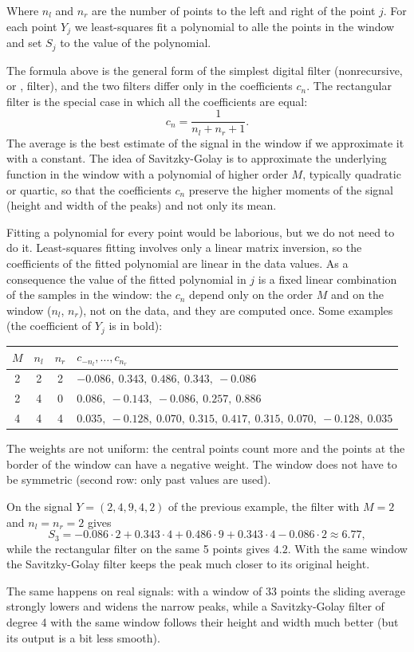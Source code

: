 Where $n_l$ and $n_r$ are the number of points to the left and right of the point $j$. For each point $Y_j$ we least-squares fit a polynomial to alle the points in the window and set $S_j$ to the value of the polynomial.

The formula above is the general form of the simplest digital filter (nonrecursive, or , filter), and the two filters differ only in the coefficients $c_n$. The rectangular filter is the special case in which all the coefficients are equal:
\[
    c_n=\frac{1}{n_l+n_r+1}.
\]
The average is the best estimate of the signal in the window if we approximate it with a constant. The idea of Savitzky-Golay is to approximate the underlying function in the window with a polynomial of higher order $M$, typically quadratic or quartic, so that the coefficients $c_n$ preserve the higher moments of the signal (height and width of the peaks) and not only its mean.

Fitting a polynomial for every point would be laborious, but we do not need to do it. Least-squares fitting involves only a linear matrix inversion, so the coefficients of the fitted polynomial are linear in the data values. As a consequence the value of the fitted polynomial in $j$ is a fixed linear combination of the samples in the window: the $c_n$ depend only on the order $M$ and on the window ($n_l$, $n_r$), not on the data, and they are computed once. Some examples (the coefficient of $Y_j$ is in bold):
\begin{center}
\begin{tabular}{cccl}
\toprule
$M$ & $n_l$ & $n_r$ & $c_{-n_l},\dots,c_{n_r}$ \\
\midrule
2 & 2 & 2 & $-0.086,\ 0.343,\ \mathbf{0.486},\ 0.343,\ -0.086$ \\
2 & 4 & 0 & $0.086,\ -0.143,\ -0.086,\ 0.257,\ \mathbf{0.886}$ \\
4 & 4 & 4 & $0.035,\ -0.128,\ 0.070,\ 0.315,\ \mathbf{0.417},\ 0.315,\ 0.070,\ -0.128,\ 0.035$ \\
\bottomrule
\end{tabular}
\end{center}
The weights are not uniform: the central points count more and the points at the border of the window can have a negative weight. The window does not have to be symmetric (second row: only past values are used).
\begin{example}
    On the signal $Y=(2,4,9,4,2)$ of the previous example, the filter with $M=2$ and $n_l=n_r=2$ gives
    \[
        S_3=-0.086\cdot 2+0.343\cdot 4+0.486\cdot 9+0.343\cdot 4-0.086\cdot 2\approx 6.77,
    \]
    while the rectangular filter on the same 5 points gives $4.2$. With the same window the Savitzky-Golay filter keeps the peak much closer to its original height.
\end{example}
The same happens on real signals: with a window of 33 points the sliding average strongly lowers and widens the narrow peaks, while a Savitzky-Golay filter of degree 4 with the same window follows their height and width much better (but its output is a bit less smooth).

